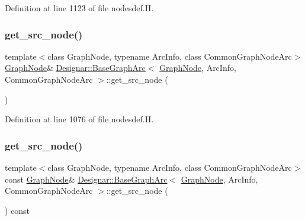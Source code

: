 Definition at line 1123 of file nodesdef.\+H.

\mbox{\label{class_designar_1_1_base_graph_arc_ae5bf587f363169ac3cf0de8808410476}} 
\subsubsection{\texorpdfstring{get\+\_\+src\+\_\+node()}{get\_src\_node()}\hspace{0.1cm}{\footnotesize\ttfamily [1/2]}}
{\footnotesize\ttfamily template$<$class Graph\+Node, typename Arc\+Info, class Common\+Graph\+Node\+Arc$>$ \\
\hyperlink{class_designar_1_1_graph_node}{Graph\+Node}\& \hyperlink{class_designar_1_1_base_graph_arc}{Designar\+::\+Base\+Graph\+Arc}$<$ \hyperlink{class_designar_1_1_graph_node}{Graph\+Node}, Arc\+Info, Common\+Graph\+Node\+Arc $>$\+::get\+\_\+src\+\_\+node (\begin{DoxyParamCaption}{ }\end{DoxyParamCaption})\hspace{0.3cm}{\ttfamily [inline]}}



Definition at line 1076 of file nodesdef.\+H.

\mbox{\label{class_designar_1_1_base_graph_arc_abf7c4174301f972969bc11e9154a353a}} 
\subsubsection{\texorpdfstring{get\+\_\+src\+\_\+node()}{get\_src\_node()}\hspace{0.1cm}{\footnotesize\ttfamily [2/2]}}
{\footnotesize\ttfamily template$<$class Graph\+Node, typename Arc\+Info, class Common\+Graph\+Node\+Arc$>$ \\
const \hyperlink{class_designar_1_1_graph_node}{Graph\+Node}\& \hyperlink{class_designar_1_1_base_graph_arc}{Designar\+::\+Base\+Graph\+Arc}$<$ \hyperlink{class_designar_1_1_graph_node}{Graph\+Node}, Arc\+Info, Common\+Graph\+Node\+Arc $>$\+::get\+\_\+src\+\_\+node (\begin{DoxyParamCaption}{ }\end{DoxyParamCaption}) const\hspace{0.3cm}{\ttfamily [inline]}}



